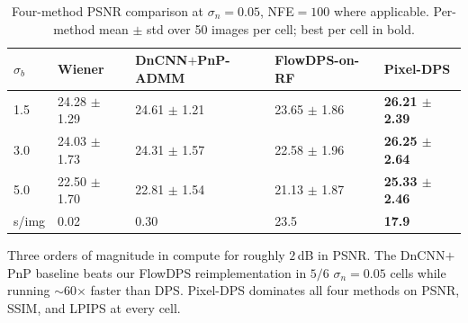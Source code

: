 \documentclass{article}
\begin{document}
\begin{table}[h]
  \centering
  \caption{Four-method PSNR comparison at $\sigma_n{=}0.05$, NFE${=}100$
    where applicable. Per-method mean $\pm$ std over 50 images per cell;
    best per cell in bold.}
  \label{tab:baselines}
  \begin{tabular}{llll>{\bfseries}l}
    \toprule
    $\sigma_b$ & Wiener & DnCNN$+$PnP-ADMM & FlowDPS-on-RF & Pixel-DPS \\
    \midrule
    1.5 & 24.28 $\pm$ 1.29 & 24.61 $\pm$ 1.21 & 23.65 $\pm$ 1.86 & 26.21 $\pm$ 2.39 \\
    3.0 & 24.03 $\pm$ 1.73 & 24.31 $\pm$ 1.57 & 22.58 $\pm$ 1.96 & 26.25 $\pm$ 2.64 \\
    5.0 & 22.50 $\pm$ 1.70 & 22.81 $\pm$ 1.54 & 21.13 $\pm$ 1.87 & 25.33 $\pm$ 2.46 \\
    \midrule
    s/img & 0.02 & 0.30 & 23.5 & 17.9 \\
    \bottomrule
  \end{tabular}
\end{table}

Three orders of magnitude in compute for roughly $2$\,dB in PSNR. The
DnCNN$+$PnP baseline beats our FlowDPS reimplementation in $5/6$
$\sigma_n{=}0.05$ cells while running $\sim$60$\times$ faster than DPS.
Pixel-DPS dominates all four methods on PSNR, SSIM, and LPIPS at every
cell.
\end{document}
